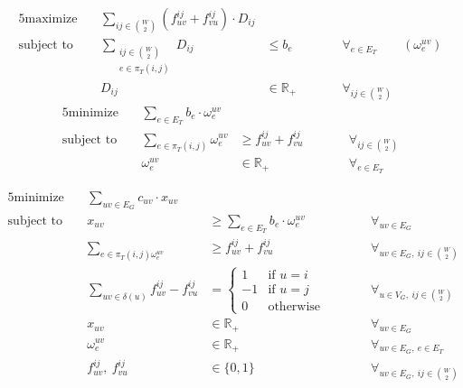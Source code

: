 \begin{alignat*}{5}
    \text{maximize}\ && \sum_{ij \in \binom{W}{2}} (f_{uv}^{ij} + f_{vu}^{ij}) \cdot D_{ij} &&& \\
    \text{subject to}\ && \sum_{\substack{ij \in \binom{W}{2}\\e \in \pi_T(i,j)}} D_{ij} &\le b_e &&\qquad \forall_{e \in E_T} \qquad (\omega_e^{uv}) \\
    && D_{ij} &\in \mathbb{R}_+ &&\qquad \forall_{ij \in \binom{W}{2}}
\end{alignat*}
\hrulefill
\begin{alignat*}{5}
    \text{minimize}\ && \sum_{e \in E_T} b_e \cdot \omega_e^{uv} &&& \\
    \text{subject to}\ && \sum_{e \in \pi_T(i,j)} \omega_e^{uv} &\ge f_{uv}^{ij} + f_{vu}^{ij} &&\qquad \forall_{ij \in \binom{W}{2}} \\
    && \omega_e^{uv} &\in \mathbb{R}_+ &&\qquad \forall_{e \in E_T}
\end{alignat*}

\begin{alignat*}{5}
    \text{minimize}\ && \sum_{uv \in E_G} c_{uv} \cdot x_{uv} &&& \\
    \text{subject to}\ && x_{uv} &\ge \sum_{e \in E_T} b_e \cdot \omega_e^{uv} &&\qquad \forall_{uv \in E_G} \\
    && \sum_{e \in \pi_T(i,j) \omega_e^{uv}} &\ge f_{uv}^{ij} + f_{vu}^{ij} &&\qquad \forall_{uv \in E_G,\ ij \in \binom{W}{2}} \\
    && \sum_{uv \in \delta(u)} f_{uv}^{ij} - f_{vu}^{ij} &= \begin{cases}
                                                                1 & \text{if $u = i$} \\
                                                                -1 & \text{if $u = j$} \\
                                                                0 & \text{otherwise}
    \end{cases} &&\qquad \forall_{u \in V_G,\ ij \in \binom{W}{2}} \\
    && x_{uv} &\in \mathbb{R}_+ &&\qquad \forall_{uv \in E_G} \\
    && \omega_e^{uv} &\in \mathbb{R}_+ &&\qquad \forall_{uv \in E_G,\ e \in E_T} \\
    && f_{uv}^{ij},\ f_{vu}^{ij} &\in \{ 0, 1 \} &&\qquad \forall_{uv \in E_G,\ ij \in \binom{W}{2}}
\end{alignat*}%

